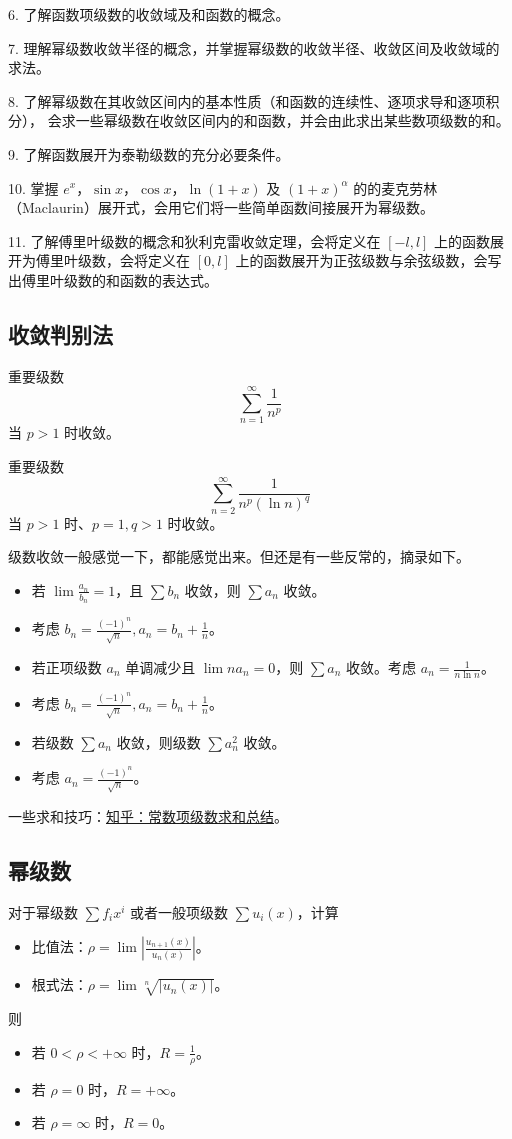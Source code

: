 6. 了解函数项级数的收敛域及和函数的概念。

7. 理解幂级数收敛半径的概念，并掌握幂级数的收敛半径、收敛区间及收敛域的求法。

8. 了解幂级数在其收敛区间内的基本性质（和函数的连续性、逐项求导和逐项积分），
会求一些幂级数在收敛区间内的和函数，并会由此求出某些数项级数的和。

9. 了解函数展开为泰勒级数的充分必要条件。

10. 掌握 $e^x$，$\sin x$，$\cos x$，$\ln(1+x)$ 及 $(1+x)^{\alpha}$ 的的麦克劳林（Maclaurin）展开式，会用它们将一些简单函数间接展开为幂级数。

11. 了解傅里叶级数的概念和狄利克雷收敛定理，会将定义在 $[-l, l]$ 上的函数展开为傅里叶级数，会将定义在 $[0, l]$ 上的函数展开为正弦级数与余弦级数，会写出傅里叶级数的和函数的表达式。

\subsection{收敛判别法}

重要级数
\[ \sum_{n=1}^\infty {\frac{1}{n^p}} \]
当 $p > 1$ 时收敛。

重要级数
\[ \sum_{n=2}^\infty {\frac{1}{n^p (\ln n)^q}} \]
当 $p > 1$ 时、$p=1, q > 1$ 时收敛。

级数收敛一般感觉一下，都能感觉出来。但还是有一些反常的，摘录如下。
\begin{itemize}
	\item 若 $\lim \frac{a_n}{b_n} = 1$，且 $\sum b_n$ 收敛，则 $\sum a_n$ 收敛。
	\item 考虑 $b_n = \frac{(-1)^n}{\sqrt{n}}, a_n = b_n + \frac{1}{n}$。
	\item 若正项级数 $a_n$ 单调减少且 $\lim n a_n = 0$，则 $\sum a_n$ 收敛。考虑 $a_n = \frac{1}{n \ln n}$。
	\item 考虑 $b_n = \frac{(-1)^n}{\sqrt{n}}, a_n = b_n + \frac{1}{n}$。
	\item 若级数 $\sum a_n$ 收敛，则级数 $\sum a_n^2$ 收敛。
	\item 考虑 $a_n = \frac{(-1)^n}{\sqrt{n}}$。
\end{itemize}

一些求和技巧：\href{https://zhuanlan.zhihu.com/p/357350424}{知乎：常数项级数求和总结}。

\subsection{幂级数}


对于幂级数 $\sum f_i x^i$ 或者一般项级数 $\sum u_i(x)$，计算
\begin{itemize}
	\item 比值法：$\rho = \lim \left| \frac{u_{n+1}(x)}{u_n(x)} \right|$。
	\item 根式法：$\rho = \lim \sqrt[n]{|u_n(x)|}$。
\end{itemize}
则
\begin{itemize}
	\item 若 $0 < \rho < +\infty$ 时，$R = \frac{1}{\rho}$。
	\item 若 $\rho = 0$ 时，$R = +\infty$。
	\item 若 $\rho = \infty$ 时，$R = 0$。
\end{itemize}


